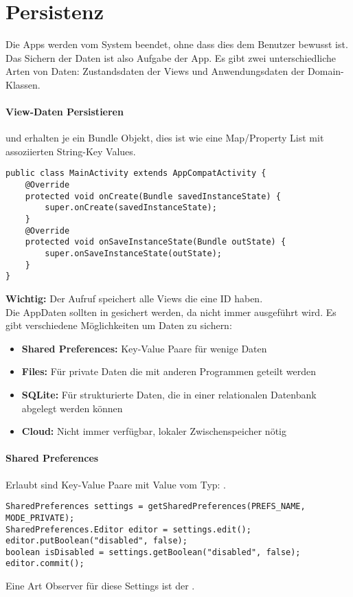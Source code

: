 \section{Persistenz}
Die Apps werden vom System beendet, ohne dass dies dem Benutzer bewusst ist. Das Sichern der Daten ist also Aufgabe der App. Es gibt zwei unterschiedliche Arten von Daten: Zustandsdaten der Views und Anwendungsdaten der Domain-Klassen.
\paragraph{View-Daten Persistieren}  und  erhalten je ein Bundle Objekt, dies ist wie eine Map/Property List mit assoziierten String-Key Values.
\begin{lstlisting}
public class MainActivity extends AppCompatActivity {
    @Override
    protected void onCreate(Bundle savedInstanceState) {
        super.onCreate(savedInstanceState);
    }
    @Override
    protected void onSaveInstanceState(Bundle outState) {
        super.onSaveInstanceState(outState);
    }
}
\end{lstlisting}
\textbf{Wichtig:} Der  Aufruf speichert alle Views die eine ID haben.\\
Die AppDaten sollten in  gesichert werden, da  nicht immer ausgeführt wird. Es gibt verschiedene Möglichkeiten um Daten zu sichern:
\begin{itemize}
\item \textbf{Shared Preferences:} Key-Value Paare für wenige Daten
\item \textbf{Files:} Für private Daten die mit anderen Programmen geteilt werden
\item \textbf{SQLite:} Für strukturierte Daten, die in einer relationalen Datenbank abgelegt werden können
\item \textbf{Cloud:} Nicht immer verfügbar, lokaler Zwischenspeicher nötig
\end{itemize}
\paragraph{Shared Preferences} Erlaubt sind Key-Value Paare mit Value vom Typ: . 
\begin{lstlisting}
SharedPreferences settings = getSharedPreferences(PREFS_NAME, MODE_PRIVATE);
SharedPreferences.Editor editor = settings.edit();
editor.putBoolean("disabled", false);
boolean isDisabled = settings.getBoolean("disabled", false);
editor.commit();
\end{lstlisting}
Eine Art Observer für diese Settings ist der .
